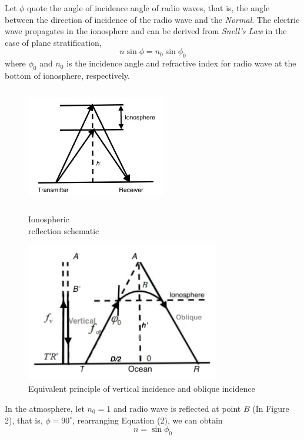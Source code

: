\documentclass{mcmthesis}
\begin{document}
Let $\phi$ quote the angle of incidence angle of radio waves, that is, the angle between the direction of incidence of the radio wave and the \textit{Normal}.
The electric wave propagates in the ionosphere and can be derived from \textit{Snell's Law} in the case of plane stratification,
\begin{equation}
n\sin\phi = n_0 \sin\phi_0
\end{equation}
where $\phi_0$ and $n_0$ is the incidence angle and refractive index for radio wave at the bottom of ionosphere, respectively.
\begin{figure}
\begin{minipage}[t]{0.5\linewidth}
\centering
\includegraphics[width=2.4in,height=2.0in]{./figure/layor_reflect.png}
\caption{Ionospheric \protect\\ reflection schematic}
\label{fig:side:a}
\end{minipage}%
\begin{minipage}[t]{0.5\linewidth}
\centering
\includegraphics[width=3.in,height=2.4in]{./figure/layor_top.png}
\caption{Equivalent principle of vertical incidence and oblique incidence}
\label{fig:side:b}
\end{minipage}
\end{figure}    

In the atmosphere, let $n_0=1$ and radio wave is reflected at point $B$ (In Figure 2), that is, $\phi=90^\circ$, rearranging Equation (2), we can obtain
\begin{equation} 
n = \sin\phi_0
\end{equation}
 
\end{document}
